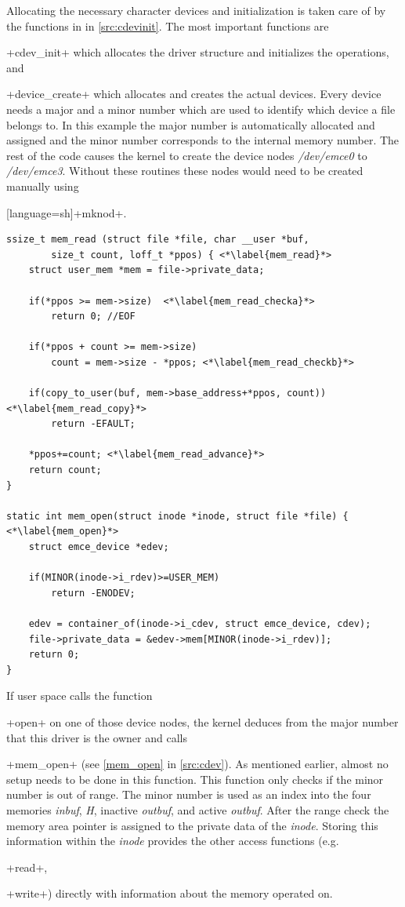 \documentclass[12pt,a4paper,parskip=full,abstract=true,BCOR=12mm]{scrreprt}
\newcommand{\hack}{}
\newcommand*{\SavedLstInline}{}
\DeclareRobustCommand*{\lstinline}{%
  \ifmmode
    \let\SavedBGroup\bgroup
    \def\bgroup{%
      \let\bgroup\SavedBGroup
      \hbox\bgroup
    }%
  \fi
  \SavedLstInline
}
\def\device#1{\mbox{\textit{#1}}}
\begin{document}
Allocating the necessary character devices and initialization is taken care of
by the functions in  in \cref{src:cdevinit}.
The most important functions are \lstinline+cdev_init+ which allocates the driver structure
and initializes the operations, and \lstinline+device_create+ which allocates
and creates the actual devices\cite{ldd}. Every device needs a major and a minor number
which are used to identify which device a file belongs to. In this example the
major number is automatically allocated and assigned and the minor number
corresponds to the internal memory number. The rest of the code
causes the kernel to create the device nodes \device{/dev/emce0} to
\device{/dev/emce3}. Without these routines these nodes would need to be created
manually using \lstinline[language=sh]+mknod+.

\begin{lstlisting}[float=htb,caption={Character device access functions},label=src:cdev,basicstyle=\hack\scriptsize]
ssize_t mem_read (struct file *file, char __user *buf,
		size_t count, loff_t *ppos) { <*\label{mem_read}*>
	struct user_mem *mem = file->private_data;

	if(*ppos >= mem->size)  <*\label{mem_read_checka}*>
		return 0; //EOF

	if(*ppos + count >= mem->size)
		count = mem->size - *ppos; <*\label{mem_read_checkb}*>

	if(copy_to_user(buf, mem->base_address+*ppos, count)) <*\label{mem_read_copy}*>
		return -EFAULT;

	*ppos+=count; <*\label{mem_read_advance}*>
	return count;
}

static int mem_open(struct inode *inode, struct file *file) { <*\label{mem_open}*>
	struct emce_device *edev;

	if(MINOR(inode->i_rdev)>=USER_MEM)
		return -ENODEV;

	edev = container_of(inode->i_cdev, struct emce_device, cdev);
	file->private_data = &edev->mem[MINOR(inode->i_rdev)];
	return 0;
}
\end{lstlisting}

If user space calls the function \lstinline+open+ on one of those device nodes, the
kernel deduces from the major number that this driver is the owner and calls
\lstinline+mem_open+ (see \cref{mem_open} in \cref{src:cdev}). As mentioned earlier,
almost no setup needs to be done in this function. This function only checks if
the minor number is out of range. The minor number is used as an index
into the four memories \device{inbuf}, \device{H}, inactive \device{outbuf}, and
active \device{outbuf}. After the range check the memory area pointer is assigned
to the private data of the \device{inode}\cite{ldd}. Storing this information within the
\device{inode} provides the other access functions (e.g. \lstinline+read+,
\lstinline+write+) directly with information about the memory operated on.
\end{document}
